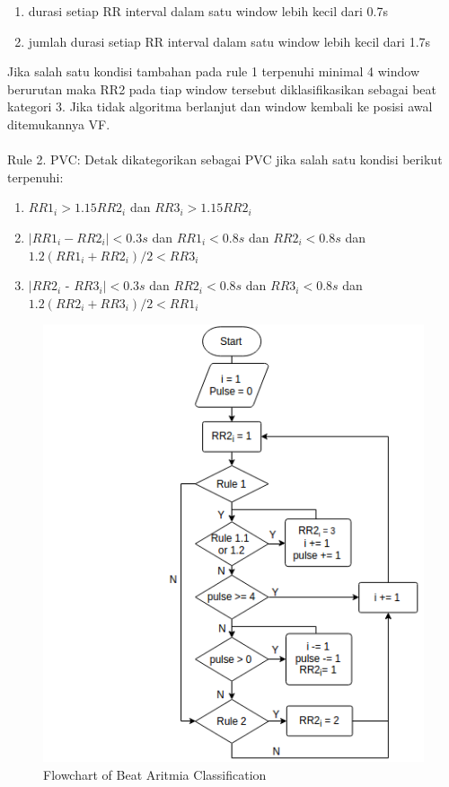 \documentclass[]{indojc}
\begin{document}
\begin{enumerate}
	\item durasi setiap RR interval dalam satu window lebih kecil dari 0.7s
	\item jumlah durasi setiap RR interval dalam satu window lebih kecil dari 1.7s
\end{enumerate}

Jika salah satu kondisi tambahan pada rule 1 terpenuhi minimal 4 window berurutan maka RR2 pada tiap window tersebut diklasifikasikan sebagai beat kategori 3. Jika tidak algoritma berlanjut dan window kembali ke posisi awal ditemukannya VF.
\\
\\
Rule 2. PVC: Detak dikategorikan sebagai PVC jika salah satu kondisi berikut terpenuhi:

\begin{enumerate}
	\item $RR1_i > 1.15RR2_i$ dan $RR3_i > 1.15RR2_i$
	\item $|RR1_i - RR2_i| < 0.3s$ dan $RR1_i < 0.8s$ dan $RR2_i < 0.8s$ dan $1.2(RR1_i + RR2_i)/2 < RR3_i$
	\item $|RR2_i$ - $RR3_i| < 0.3s$ dan $RR2_i < 0.8s$ dan $RR3_i < 0.8s$ dan $1.2(RR2_i + RR3_i)/2 < RR1_i$
\end{enumerate}

\begin{figure}[htbp]
\centerline{\includegraphics[scale=0.55]{images/flowchart_aritmia.png}}
\caption{Flowchart of Beat Aritmia Classification}
\label{fig:flowchart_aritmia}
\end{figure}
\end{document}
